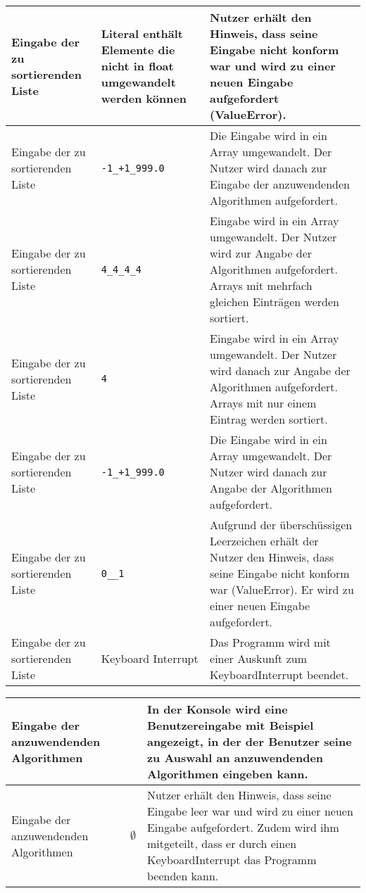 \documentclass[a4paper]{article}
\begin{document}
\begin{exercise}{1}
\begin{center}
\begin{tabular}{| p{2.5cm} | p{3.2cm} | p{9cm} |}
		Eingabe der zu sortierenden Liste & Literal enth\"alt Elemente die nicht in float umgewandelt
		werden k\"onnen
		& Nutzer erh\"alt den Hinweis, dass seine Eingabe nicht konform war und wird zu einer
		neuen Eingabe aufgefordert (ValueError).\\ \hline
		
		Eingabe der zu sortierenden Liste & \texttt{-1\_+1\_999.0}
		& Die Eingabe wird in ein Array umgewandelt. Der Nutzer wird danach zur Eingabe der
		anzuwendenden Algorithmen aufgefordert.\\ \hline
		
		Eingabe der zu sortierenden Liste & \texttt{4\_4\_4\_4}
		& Eingabe wird in ein Array umgewandelt. Der Nutzer wird zur Angabe der
		Algorithmen aufgefordert. Arrays mit mehrfach gleichen Eintr\"agen werden sortiert. \\ \hline
		
		Eingabe der zu sortierenden Liste & \texttt{4}
		& Eingabe wird in ein Array umgewandelt. Der Nutzer wird danach zur Angabe der
		Algorithmen aufgefordert. Arrays mit nur einem Eintrag werden sortiert. \\ \hline
		
		Eingabe der zu sortierenden Liste & \texttt{-1\_+1\_999.0}
		& Die Eingabe wird in ein Array umgewandelt. Der Nutzer wird danach zur Angabe der
		Algorithmen aufgefordert.\\ \hline
		
		Eingabe der zu sortierenden Liste & \texttt{0\_\_1}
		& Aufgrund der \"ubersch\"ussigen Leerzeichen erh\"alt der Nutzer den Hinweis, dass
		seine Eingabe nicht konform war (ValueError). Er wird zu einer neuen Eingabe
		aufgefordert.\\ \hline
		
		Eingabe der zu sortierenden Liste & Keyboard Interrupt
		& Das Programm wird mit einer Auskunft zum KeyboardInterrupt beendet.\\ \hline
	\end{tabular}
	
	
	\begin{tabular}{| p{2.5cm} | p{3.2cm} | p{9cm} |}
		\hline
		\textbf{Eingabe der anzuwendenden Algorithmen} &
		& In der Konsole wird eine Benutzereingabe mit Beispiel angezeigt, in der der Benutzer
		seine zu Auswahl an anzuwendenden Algorithmen eingeben kann.\\ \hline
		
		Eingabe der anzuwendenden Algorithmen & $\emptyset$ &
		Nutzer erh\"alt den Hinweis, dass seine Eingabe leer war und wird zu einer neuen Eingabe
		aufgefordert. Zudem wird ihm mitgeteilt, dass er durch einen KeyboardInterrupt das Programm
		beenden kann. \\ \hline
		

\end{tabular}
\end{center}
\end{exercise}
\end{document}

